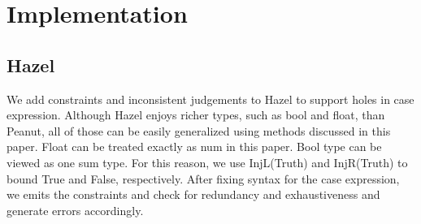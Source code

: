 \section{Implementation}
\subsection{Hazel}
We add constraints and inconsistent judgements to Hazel to support holes in case expression. Although Hazel enjoys richer types, such as bool and float, than Peanut, all of those can be easily generalized using methods discussed in this paper. Float can be treated exactly as num in this paper. Bool type can be viewed as one sum type. For this reason, we use InjL(Truth) and InjR(Truth) to bound True and False, respectively. After fixing syntax for the case expression, we emits the constraints and check for redundancy and exhaustiveness and generate errors accordingly.